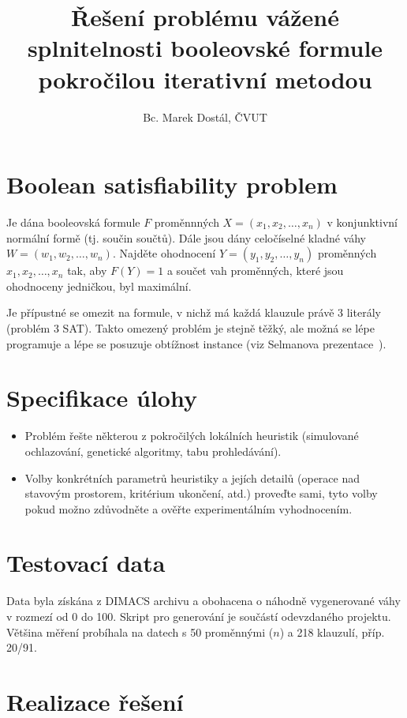 \documentclass[a4paper,10pt]{article}
\title{\bfseries Řešení problému vážené splnitelnosti booleovské formule pokročilou iterativní metodou}
\author{Bc. Marek Dostál, ČVUT}
\begin{document}
\maketitle

\section*{Boolean satisfiability problem}

Je dána booleovská formule $F$ proměnnných $X=(x_1, x_2, … , x_n)$ v konjunktivní normální
formě (tj. součin součtů). Dále jsou dány celočíselné kladné váhy $W=(w_1, w_2, … , w_n)$.
Najděte ohodnocení $Y=(y_1, y_2, … , y_n)$ proměnných $x_1, x_2, … , x_n$ tak, aby $F(Y)=1$
a součet vah proměnných, které jsou ohodnoceny jedničkou, byl maximální.

Je přípustné se omezit na formule, v nichž má každá klauzule právě 3 literály (problém 3 SAT).
Takto omezený problém je stejně těžký, ale možná se lépe programuje a lépe se posuzuje
obtížnost instance (viz Selmanova prezentace~\cite{edux-solman}).

\section*{Specifikace úlohy}

\begin{itemize}
\item Problém řešte některou z pokročilých lokálních heuristik (simulované ochlazování,
genetické algoritmy, tabu prohledávání).
\item Volby konkrétních parametrů heuristiky a jejích detailů (operace nad stavovým prostorem,
kritérium ukončení, atd.) proveďte sami, tyto volby pokud možno zdůvodněte a ověřte
experimentálním vyhodnocením.
\end{itemize}

\section*{Testovací data}

Data byla získána z DIMACS archivu \cite{edux-dimacs} a obohacena o náhodně vygenerované váhy v rozmezí od 0 do 100.
Skript pro generování je součástí odevzdaného projektu. Většina měření probíhala na datech s 50 proměnnými ($n$)
a 218 klauzulí, příp. 20/91.

\section*{Realizace řešení}
\end{document}
